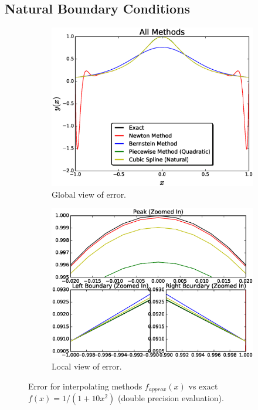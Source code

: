 \documentclass[12pt]{article}
\theoremstyle{remark}
\begin{document}
\subsection{Natural Boundary Conditions}

\begin{figure}[H]
	\centering
	\begin{subfigure}{.5\textwidth}
		\centering
		\includegraphics[width=1.1\linewidth]{Nfig1.eps}
		\caption{Global view of error.}
		\label{fig:sub1}
	\end{subfigure}%
	\begin{subfigure}{.5\textwidth}
		\centering
		\includegraphics[width=1.1\linewidth]{NsubFig1.eps}
		\caption{Local view of error.}
		\label{fig:sub2}
	\end{subfigure}
	\caption{Error for interpolating methods $f_{approx}(x)$ vs exact $f(x) = 1/(1 + 10x^2)$ (double precision evaluation). }
	\label{fig:test}
\end{figure}
\end{document}

